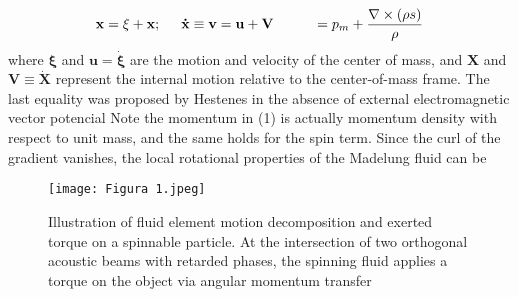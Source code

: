 \documentclass[7pt]{article}
\begin{document}
\begin{multicols}{3}
\begin{equation}
    \label{Equation 1}
    \mathbf{x = \xi + x; \hspace{.5cm} \dot{x} \equiv v = u + V} 
    
    \hspace{1cm}= p_{m} + \frac{\nabla \times (\rho s)}{\rho}
\end{equation}
\newline
\newline
where $\mathbf{\xi}$ and $\mathbf{u = \dot{\xi}}$ are the motion and velocity of the center of mass, and $\mathbf{X}$ and $\mathbf{V \equiv \dot{X}}$ represent the internal motion relative to the center-of-mass frame. 
The last equality was proposed by Hestenes in the absence of external electromagnetic vector potencial \cite{4} Note the momentum in (1) is actually momentum density with respect to unit mass, and the same holds for the spin term. Since the curl of the gradient vanishes, the local rotational properties of the Madelung fluid can be
\vspace{4cm}
\end{multicols}

\begin{figure}[h]
    \centering
        \texttt{[image: Figura 1.jpeg]}
\caption{\tiny{Illustration of fluid element motion decomposition and exerted torque on a spinnable particle. At the intersection of two orthogonal acoustic beams with retarded phases, the spinning fluid applies a torque on the object via angular momentum transfer}}
    \label{fig:my_label}
\end{figure}


\newpage
\end{document}
